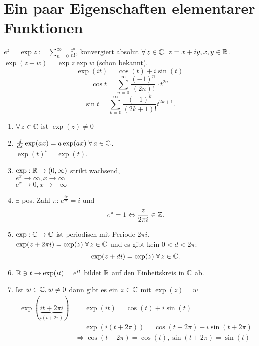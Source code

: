 \documentclass[../ana2.tex]{subfiles}
\begin{document}
\setcounter{section}{2}
\section{Ein paar Eigenschaften elementarer Funktionen}
\( e^z = \exp z := \sum_{n=0}^\infty \frac{z^n}{n!} \), 
konvergiert absolut \( \forall z\in\C \). \( z = x + iy, x,y \in \mathbb{R} \). \\
\( \exp(z + w) = \exp z \exp w \) (schon bekannt).
\[ \exp(it) = \cos(t) + i\sin(t) \]
\[ \cos t = \sum_{n=0}^{\infty} \frac{(-1)^n}{(2n)!} \cdot t^{2n} \]
\[ \sin t = \sum_{k=0}^\infty \frac{(-1)^k}{(2k+1)!} t^{2k+1}. \]
\begin{satz*}
    \begin{enumerate}[label=(\alph*)]
        \item \( \forall z \in \C \) ist \( \exp(z) \neq 0 \)
        \item \( \frac{d}{dx} \exp(ax) = a \exp(ax) 
        \;\forall a\in \C \).\\ \( \exp(t)^i = \exp(t) \).
        \item \( \exp:\mathbb{R}\rightarrow (0,\infty) \) strikt wachsend, \\
            \( e^x \rightarrow \infty, x \rightarrow \infty \) \\
            \( e^x \rightarrow 0, x \rightarrow -\infty \)
        \item \( \exists \) pos. Zahl \( \pi \): 
        \( e^{\frac{i\pi}{2}} = i \) und 
        \[ e^z = 1 \Leftrightarrow \frac{z}{2\pi i} \in \mathbb{Z}. \]
        \item \( \exp:\mathbb{C}\rightarrow \mathbb{C} \) ist periodisch mit 
        Periode \( 2\pi i \). \\
        \Dphp{} \( \exp(z +2\pi i) = \exp(z) \; \forall z\in\C \)
        und es gibt kein \( 0 < d < 2\pi \): 
        \[ \exp(z + di) = \exp(z)\; \forall z \in \C. \]
        \item \( \mathbb{R} \ni t \rightarrow \exp(it) = e^{it} \) bildet 
        \( \mathbb{R} \) auf den Einheitskreis in \( \mathbb{C} \) ab.
        \item Ist \( w \in \mathbb{C}, w \neq 0 \) dann gibt es ein \( z \in \mathbb{C} \)
        mit \( \exp(z) = w \)
        \begin{align*}
            \exp(\underbrace{it + 2\pi i}_{i(t+2\pi)}) &= \exp(it) = \cos(t) + i\sin(t) \\
            &= \exp(i(t+2\pi)) = \cos(t+2\pi) + i\sin(t+2\pi) \\
            &\Rightarrow \cos(t + 2\pi) = \cos(t), \sin(t + 2\pi) = \sin(t)
        \end{align*}
    \end{enumerate}
\end{satz*}
\end{document}
